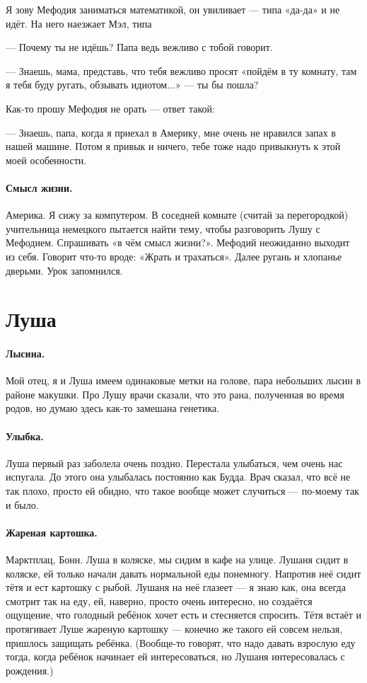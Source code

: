 \documentclass{book}
\begin{document}
Я зову Мефодия заниматься математикой, он увиливает --- типа «да-да» и не идёт.
На него наезжает Мэл, типа 

--- Почему ты не идёшь? Папа ведь вежливо с тобой говорит.

--- Знаешь, мама, представь, что тебя вежливо просят «пойдём в ту комнату, там я тебя буду ругать, обзывать идиотом...» --- ты бы пошла?

Как-то прошу Мефодия не орать --- ответ такой:

--- Знаешь, папа, когда я приехал в Америку, мне очень не нравился запах в нашей машине.
Потом я привык и ничего, тебе тоже надо привыкнуть к этой моей особенности.

\paragraph{Смысл жизни.}
Америка.
Я сижу за компутером.
В соседней комнате (считай за перегородкой) учительница немецкого пытается найти тему, чтобы разговорить Лушу с Мефодием.
Спрашивать «в чём смысл жизни?».
Мефодий неожиданно выходит из себя.
Говорит что-то вроде: «Жрать и трахаться».
Далее ругань и хлопанье дверьми.
Урок запомнился.

\section*{Луша}

\paragraph{Лысина.} Мой отец, я и Луша имеем одинаковые метки на голове, пара небольших лысин в районе макушки.
Про Лушу врачи сказали, что это рана, полученная во время родов, но думаю здесь как-то замешана генетика.

\paragraph{Улыбка.} Луша первый раз заболела очень поздно.
Перестала улыбаться, чем очень нас испугала.
До этого она улыбалась постоянно как Будда.
Врач сказал, что всё не так плохо, просто ей обидно, что такое вообще может случиться --- по-моему так и было.

\paragraph{Жареная картошка.} Марктплац, Бонн.
Луша в коляске, мы сидим в кафе на улице.
Лушаня сидит в коляске, ей только начали давать нормальной еды понемногу.
Напротив неё сидит тётя и ест картошку с рыбой.
Лушаня на неё глазеет --- я знаю как, она всегда смотрит так на еду, ей, наверно, просто очень интересно, но создаётся ощущение, что голодный ребёнок хочет есть и стесняется спросить.
Тётя встаёт и протягивает Луше жареную картошку --- конечно же такого ей совсем нельзя, пришлось защищать ребёнка.
(Вообще-то говорят, что надо давать взрослую еду тогда, когда ребёнок начинает ей интересоваться, но Лушаня интересовалась с рождения.)
\end{document}
